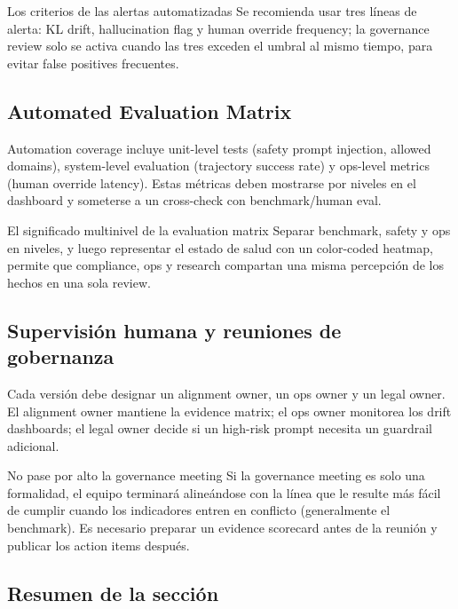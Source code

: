 \documentclass[a4paper]{article}
\begin{document}
\begin{knowledgebox}{Los criterios de las alertas automatizadas}
Se recomienda usar tres líneas de alerta: KL drift, hallucination flag y human override frequency; la governance review solo se activa cuando las tres exceden el umbral al mismo tiempo, para evitar false positives frecuentes.
\end{knowledgebox}

\subsection{Automated Evaluation Matrix}

Automation coverage incluye unit-level tests (safety prompt injection, allowed domains), system-level evaluation (trajectory success rate) y ops-level metrics (human override latency). Estas métricas deben mostrarse por niveles en el dashboard y someterse a un cross-check con benchmark/human eval.

\begin{importantbox}{El significado multinivel de la evaluation matrix}
Separar benchmark, safety y ops en niveles, y luego representar el estado de salud con un color-coded heatmap, permite que compliance, ops y research compartan una misma percepción de los hechos en una sola review.
\end{importantbox}

\subsection{Supervisión humana y reuniones de gobernanza}

Cada versión debe designar un alignment owner, un ops owner y un legal owner. El alignment owner mantiene la evidence matrix; el ops owner monitorea los drift dashboards; el legal owner decide si un high-risk prompt necesita un guardrail adicional.

\begin{warningbox}{No pase por alto la governance meeting}
Si la governance meeting es solo una formalidad, el equipo terminará alineándose con la línea que le resulte más fácil de cumplir cuando los indicadores entren en conflicto (generalmente el benchmark). Es necesario preparar un evidence scorecard antes de la reunión y publicar los action items después.
\end{warningbox}

\subsection{Resumen de la sección}
\end{document}
